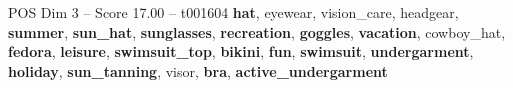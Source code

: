 \begin{textsample}{POS Dim 3 – Score 17.00 – t001604}  \label{ex:f3_pos_019}
\textbf{hat}, eyewear, vision\_care, headgear, \textbf{summer}, \textbf{sun\_hat}, \textbf{sunglasses}, \textbf{recreation}, \textbf{goggles}, \textbf{vacation}, cowboy\_hat, \textbf{fedora}, \textbf{leisure}, \textbf{swimsuit\_top}, \textbf{bikini}, \textbf{fun}, \textbf{swimsuit}, \textbf{undergarment}, \textbf{holiday}, \textbf{sun\_tanning}, visor, \textbf{bra}, \textbf{active\_undergarment}

\end{textsample}
